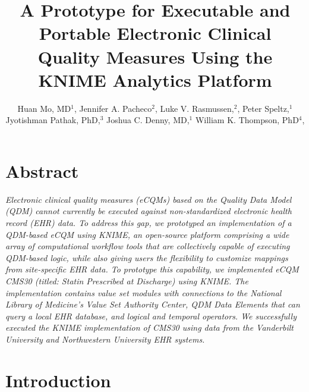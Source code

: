 \documentclass{article}
\begin{document}
\title{A Prototype for Executable and Portable Electronic Clinical Quality Measures Using the KNIME Analytics Platform}


\author{
Huan Mo, MD$^1$,
Jennifer A. Pacheco$^2$,
Luke V. Rasmussen,$^2$,
Peter Speltz,$^1$
Jyotishman Pathak, PhD,$^3$
Joshua C. Denny, MD,$^1$
William K. Thompson, PhD$^4$,
}


\maketitle

\section*{Abstract}
\textit{Electronic clinical quality measures (eCQMs) based on the Quality Data Model (QDM) cannot currently be executed against non-standardized electronic health record (EHR) data. To address this gap, we prototyped an implementation of a QDM-based eCQM using KNIME, an open-source platform comprising a wide array of computational workflow tools that are collectively capable of executing QDM-based logic, while also giving users the flexibility to customize mappings from site-specific EHR data. To prototype this capability, we implemented eCQM CMS30 (titled: Statin Prescribed at Discharge) using KNIME. The implementation contains value set modules with connections to the National Library of Medicine's Value Set Authority Center, QDM Data Elements that can query a local EHR database, and logical and temporal operators. We successfully executed the KNIME implementation of CMS30 using data from the Vanderbilt University and Northwestern University EHR systems.
}

\section{Introduction}
\end{document}

